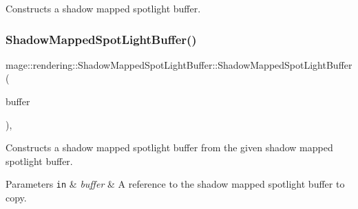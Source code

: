 Constructs a shadow mapped spotlight buffer. \hypertarget{structmage_1_1rendering_1_1_shadow_mapped_spot_light_buffer_ac984180fa57278b851bbaf3b081a4343}{}\label{structmage_1_1rendering_1_1_shadow_mapped_spot_light_buffer_ac984180fa57278b851bbaf3b081a4343} 
\subsubsection{\texorpdfstring{Shadow\+Mapped\+Spot\+Light\+Buffer()}{ShadowMappedSpotLightBuffer()}\hspace{0.1cm}{\footnotesize\ttfamily [2/3]}}
{\footnotesize\ttfamily mage\+::rendering\+::\+Shadow\+Mapped\+Spot\+Light\+Buffer\+::\+Shadow\+Mapped\+Spot\+Light\+Buffer (\begin{DoxyParamCaption}\item[{const \hyperlink{structmage_1_1rendering_1_1_shadow_mapped_spot_light_buffer}{Shadow\+Mapped\+Spot\+Light\+Buffer} \&}]{buffer }\end{DoxyParamCaption})\hspace{0.3cm}{\ttfamily [default]}, {\ttfamily [noexcept]}}

Constructs a shadow mapped spotlight buffer from the given shadow mapped spotlight buffer.


\begin{DoxyParams}[1]{Parameters}
\mbox{\tt in}  & {\em buffer} & A reference to the shadow mapped spotlight buffer to copy. \\
\hline
\end{DoxyParams}
\hypertarget{structmage_1_1rendering_1_1_shadow_mapped_spot_light_buffer_a9042ab916ee834f5519b5930de286ea4}{}\label{structmage_1_1rendering_1_1_shadow_mapped_spot_light_buffer_a9042ab916ee834f5519b5930de286ea4} 
